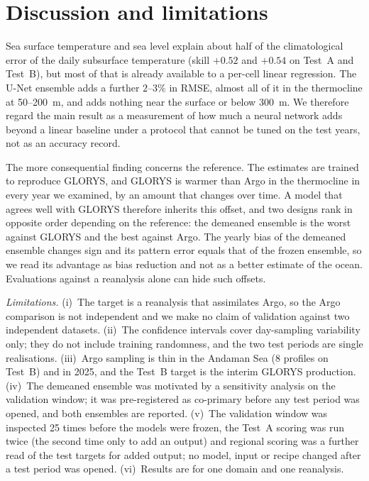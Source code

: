 
\section{Discussion and limitations}
\label{sec:discussion}
Sea surface temperature and sea level explain about half of the climatological error of the daily subsurface temperature (skill $+0.52$ and $+0.54$ on Test~A and Test~B), but most of that is already available to a per-cell linear regression. The U-Net ensemble adds a further $2$--$3\%$ in RMSE, almost all of it in the thermocline at 50--200~m, and adds nothing near the surface or below 300~m. We therefore regard the main result as a measurement of how much a neural network adds beyond a linear baseline under a protocol that cannot be tuned on the test years, not as an accuracy record.

The more consequential finding concerns the reference. The estimates are trained to reproduce GLORYS, and GLORYS is warmer than Argo in the thermocline in every year we examined, by an amount that changes over time. A model that agrees well with GLORYS therefore inherits this offset, and two designs rank in opposite order depending on the reference: the demeaned ensemble is the worst against GLORYS and the best against Argo. The yearly bias of the demeaned ensemble changes sign and its pattern error equals that of the frozen ensemble, so we read its advantage as bias reduction and not as a better estimate of the ocean. Evaluations against a reanalysis alone can hide such offsets.

\emph{Limitations.} (i)~The target is a reanalysis that assimilates Argo, so the Argo comparison is not independent and we make no claim of validation against two independent datasets. (ii)~The confidence intervals cover day-sampling variability only; they do not include training randomness, and the two test periods are single realisations. (iii)~Argo sampling is thin in the Andaman Sea (8 profiles on Test~B) and in 2025, and the Test~B target is the interim GLORYS production. (iv)~The demeaned ensemble was motivated by a sensitivity analysis on the validation window; it was pre-registered as co-primary before any test period was opened, and both ensembles are reported. (v)~The validation window was inspected 25 times before the models were frozen, the Test~A scoring was run twice (the second time only to add an output) and regional scoring was a further read of the test targets for added output; no model, input or recipe changed after a test period was opened. (vi)~Results are for one domain and one reanalysis.

